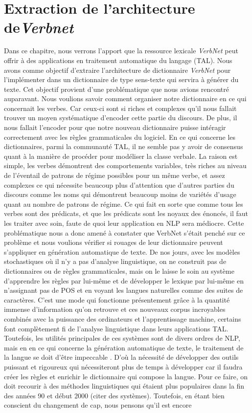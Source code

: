 
\chapter{Extraction de l'architecture de\emph{Verbnet}}

Dans ce chapitre, nous verrons l'apport que la ressource lexicale \emph{VerbNet} peut offrir à des applications en traitement automatique du langage (TAL). Nous avons comme objectif d'extraire l'architecture de dictionnaire \emph{VerbNet} pour l'implémenter dans un dictionnaire de type sens-texte qui servira à générer du texte. Cet objectif provient d'une problématique que nous avions rencontré auparavant. Nous voulions savoir comment organiser notre dictionnaire en ce qui concernait les verbes. Car ceux-ci sont si riches et complexes qu'il nous fallait trouver un moyen systématique d'encoder cette partie du discours. De plus, il nous fallait l'encoder pour que notre nouveau dictionnaire puisse intéragir correctement avec les règles grammaticales du logiciel. En ce qui concerne les dictionnaires, parmi la communauté TAL,  il ne semble pas y avoir de consensus quant à la manière de procéder pour modéliser la classe verbale. La raison est simple,  les verbes démontrent des comportements variables, très riches au niveau de l'éventail de patrons de régime possibles pour un même verbe, et assez complexes ce qui nécessite beaucoup plus d'attention que d'autres parties du discours comme les noms qui démontrent beaucoup moins de variétés d'usage quant au nombre de patrons de régime. Ce qui fait en sorte que comme tous les verbes sont des prédicats, et que les prédicats sont les noyaux des énoncés, il faut les traiter avec soin, faute de quoi leur application en NLP sera médiocre. Cette problématique nous a donc amené à constater que VerbNet s'était penché sur ce problème et nous voulions vérifier si rouages de leur dictionnaire peuvent s'appliquer en génération automatique de texte. De nos jours, avec les modèles stochastiques où il n'y a pas d'analyse linguistique, on ne construit pas de dictionnaires ou de règles grammaticales, mais on le laisse le soin au système d'apprendre les règles par lui-même et de développer le lexique par lui-même en n'assignant pas de POS et en voyant les langues naturelles comme des suites de caractères. C'est une mode qui fonctionne présentement grâce à la quantité immense d'information qu'on retrouve et ces nouveaux corpus incroyables combinés avec la puissance des ordinateurs et l'apprentissage machine, certains font complètement fi de l'analyse linguistique dans leurs applications TAL. Toutefois, les utilités principales de ces systèmes sont de divers ordres de NLP, mais en en ce qui concerne la génération automatique de texte, le traitement de la langue se doit d'être impeccable \citep{lareau18}. D'où la nécessité de développer des outils puissant et rigoureux qui nécessiteront plus de temps à développer car il faudra créer les règles et enrichir le dictionnaire qui compose la langue. Pour ce faire, on doit recourir à des méthodes linguistiques qui étaient plus populaires dans la fin des années 90 et début 2000 (citer des systèmes). Toutefois, en étant bien conscient du changement de cap, nous pensons qu'il est encore 